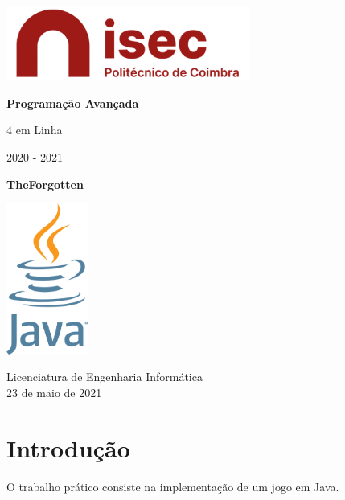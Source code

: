 \documentclass[11pt]{article}
\begin{document}
	\begin{titlepage}
    	\begin{center}
    		\includegraphics[width=0.6\textwidth]{logo-isec}
    		
    		\vspace*{\fill}
    		
    		\Huge
    		\textbf{Programação Avançada}
    		
    		\huge
    		4 em Linha
    		
    		\vspace{0.5cm}
    		\LARGE
    		2020 - 2021
    		
    		\vspace{1.5cm}
    		
    		\textbf{TheForgotten}
    		
    		\vspace*{\fill}
    		\includegraphics[width=0.2\textwidth]{logo-java}
    		
    		\vfill
    		\vspace*{\fill}
    		
    		\normalsize
    		Licenciatura de Engenharia Informática \\
    		23 de maio de 2021		
    	\end{center}
    \end{titlepage}
	
	\tableofcontents
	\pagebreak
	
	\large
	\section{Introdução}
	\normalsize
	
	O trabalho prático consiste na implementação de um jogo em Java.
	
\end{document}
